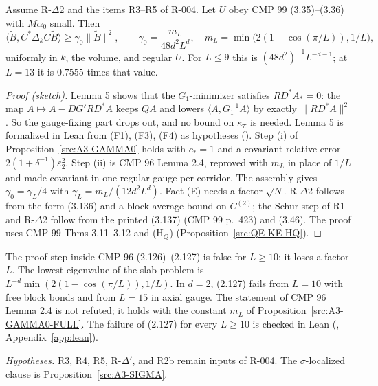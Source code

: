 \begin{proposition}\label{src:A3-GAMMA0-FULL}
Assume R-$\Delta$2 and the items R3--R5 of R-004. Let $U$ obey CMP 99 (3.35)--(3.36) with $M\alpha_0$ small. Then
\[
\langle\tilde B,C^*\Delta_kC\tilde B\rangle\ge\gamma_0\|\tilde B\|^2,\qquad\gamma_0=\frac{m_L}{48d^2L^d},\quad m_L=\min\bigl(2(1-\cos(\pi/L)),1/L\bigr),
\]
uniformly in $k$, the volume, and regular $U$. For $L\le9$ this is $(48d^2)^{-1}L^{-d-1}$; at $L=13$ it is $0.7555$ times that value.
\end{proposition}
\begin{proof}[Proof (sketch)]
Lemma 5 shows that the $G_1$-minimizer satisfies $RD^*A_*=0$: the map $A\mapsto A-DG'RD^*A$ keeps $QA$ and lowers $\langle A,G_1^{-1}A\rangle$ by exactly $\|RD^*A\|^2$. So the gauge-fixing part drops out, and no bound on $\kappa_\pi$ is needed. Lemma 5 is formalized in Lean from (F1), (F3), (F4) as hypotheses (). Step (i) of Proposition~\ref{src:A3-GAMMA0} holds with $c_*=1$ and a covariant relative error $2(1+\delta^{-1})\varepsilon_2^2$. Step (ii) is CMP 96 Lemma 2.4, reproved with $m_L$ in place of $1/L$ and made covariant in one regular gauge per corridor. The assembly gives $\gamma_0=\gamma_L/4$ with $\gamma_L=m_L/(12d^2L^d)$. Fact (E) needs a factor $\sqrt N$. R-$\Delta$2 follows from the form (3.136) and a block-average bound on $C^{(2)}$; the Schur step of R1 and R-$\Delta$2 follow from the printed (3.137) (CMP 99 p.~423) and (3.46). The proof uses CMP 99 Thms 3.11--3.12 and (H$_Q$) (Proposition~\ref{src:QE-KE-HQ}).
\end{proof}
\begin{remark}\label{src:A3-GAMMA0-FULL-slab}
The proof step inside CMP 96 (2.126)--(2.127) is false for $L\ge10$: it loses a factor $L$. The lowest eigenvalue of the slab problem is $L^{-d}\min(2(1-\cos(\pi/L)),1/L)$. In $d=2$, (2.127) fails from $L=10$ with free block bonds and from $L=15$ in axial gauge. The statement of CMP 96 Lemma 2.4 is not refuted; it holds with the constant $m_L$ of Proposition~\ref{src:A3-GAMMA0-FULL}. The failure of (2.127) for every $L\ge10$ is checked in Lean (, Appendix~\ref{app:lean}).
\end{remark}
\emph{Hypotheses.} R3, R4, R5, R-$\Delta'$, and R2b remain inputs of R-004. The $\sigma$-localized clause is Proposition~\ref{src:A3-SIGMA}.

